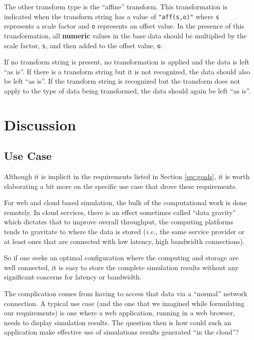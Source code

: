 \documentclass[11pt,a4paper,twocolumn]{article}
\newcommand{\code}[1]{\texttt{#1}} %
\begin{document}
The other transform type is the ``affine'' transform.  This
transformation is indicated when the transform string has a value of
\code{"aff(s,o)"} where \code{s} represents a scale factor and
\code{o} represents an offset value.  In the presence of this
transformation, all \textbf{numeric} values in the base data should be
multiplied by the scale factor, \code{s}, and then added to the offset
value, \code{o}.

If no transform string is present, no transformation is applied and
the data is left ``as is''.  If there is a transform string but it is
not recognized, the data should also be left ``as is''.  If the
transform string is recognized but the transform does not apply to the
type of data being transformed, the data should again be left ``as
is''.

\section{Discussion}
\label{sec:discussion}

\subsection{Use Case}

Although it is implicit in the requirements listed in Section
\ref{sec:goals}, it is worth elaborating a bit more on the specific
use case that drove these requirements.

For web and cloud based simulation, the bulk of the computational work
is done remotely.  In cloud services, there is an effect sometimes
called ``data gravity'' which dictates that to improve overall
throughput, the computing platforms tends to gravitate to where the
data is stored (\textit{i.e.,} the same service provider or at least
ones that are connected with low latency, high bandwidth connections).

So if one seeks an optimal configuration where the computing and
storage are well connected, it is easy to store the complete
simulation results without any significant concerns for latency or
bandwidth.

The complication comes from having to access that data via a
``normal'' network connection.  A typical use case (and the one that
we imagined while formulating our requirements) is one where a web
application, running in a web browser, needs to display simulation
results.  The question then is how could such an application make
effective use of simulations results generated ``in the cloud''?
\end{document}

